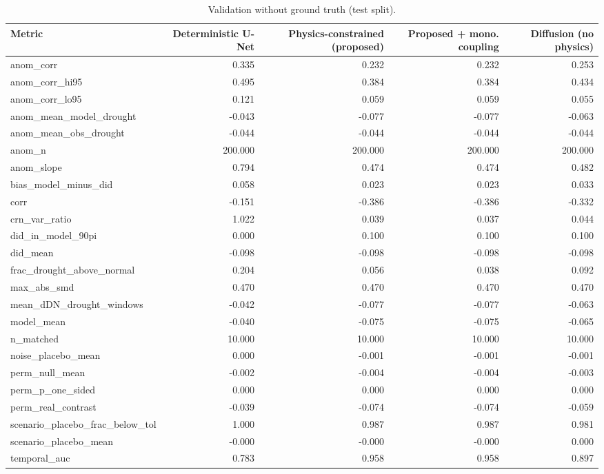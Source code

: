 \begin{table}[t]
\centering
\caption{Validation without ground truth (test split).}
\label{tab:validation}
\scriptsize
\begin{tabular}{lrrrr}
\hline
Metric & Deterministic U-Net & Physics-constrained (proposed) & Proposed + mono. coupling & Diffusion (no physics) \\
\hline
anom\_corr & 0.335 & 0.232 & 0.232 & 0.253 \\
anom\_corr\_hi95 & 0.495 & 0.384 & 0.384 & 0.434 \\
anom\_corr\_lo95 & 0.121 & 0.059 & 0.059 & 0.055 \\
anom\_mean\_model\_drought & -0.043 & -0.077 & -0.077 & -0.063 \\
anom\_mean\_obs\_drought & -0.044 & -0.044 & -0.044 & -0.044 \\
anom\_n & 200.000 & 200.000 & 200.000 & 200.000 \\
anom\_slope & 0.794 & 0.474 & 0.474 & 0.482 \\
bias\_model\_minus\_did & 0.058 & 0.023 & 0.023 & 0.033 \\
corr & -0.151 & -0.386 & -0.386 & -0.332 \\
crn\_var\_ratio & 1.022 & 0.039 & 0.037 & 0.044 \\
did\_in\_model\_90pi & 0.000 & 0.100 & 0.100 & 0.100 \\
did\_mean & -0.098 & -0.098 & -0.098 & -0.098 \\
frac\_drought\_above\_normal & 0.204 & 0.056 & 0.038 & 0.092 \\
max\_abs\_smd & 0.470 & 0.470 & 0.470 & 0.470 \\
mean\_dDN\_drought\_windows & -0.042 & -0.077 & -0.077 & -0.063 \\
model\_mean & -0.040 & -0.075 & -0.075 & -0.065 \\
n\_matched & 10.000 & 10.000 & 10.000 & 10.000 \\
noise\_placebo\_mean & 0.000 & -0.001 & -0.001 & -0.001 \\
perm\_null\_mean & -0.002 & -0.004 & -0.004 & -0.003 \\
perm\_p\_one\_sided & 0.000 & 0.000 & 0.000 & 0.000 \\
perm\_real\_contrast & -0.039 & -0.074 & -0.074 & -0.059 \\
scenario\_placebo\_frac\_below\_tol & 1.000 & 0.987 & 0.987 & 0.981 \\
scenario\_placebo\_mean & -0.000 & -0.000 & -0.000 & 0.000 \\
temporal\_auc & 0.783 & 0.958 & 0.958 & 0.897 \\
\hline
\end{tabular}
\end{table}
